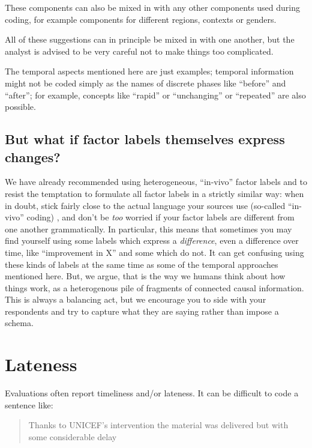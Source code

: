 \documentclass[
]{book}
\begin{document}
These components can also be mixed in with any other components used during coding, for example components for different regions, contexts or genders.

All of these suggestions can in principle be mixed in with one another, but the analyst is advised to be very careful not to make things too complicated.

The temporal aspects mentioned here are just examples; temporal information might not be coded simply as the names of discrete phases like ``before'' and ``after''; for example, concepts like ``rapid'' or ``unchanging'' or ``repeated'' are also possible.

\hypertarget{but-what-if-factor-labels-themselves-express-changes}{%
\subsection{But what if factor labels themselves express changes?}\label{but-what-if-factor-labels-themselves-express-changes}}

We have already recommended using heterogeneous, ``in-vivo'' factor labels and to resist the temptation to formulate all factor labels in a strictly similar way: when in doubt, stick fairly close to the actual language your sources use (so-called ``in-vivo'' coding) , and don't be \emph{too} worried if your factor labels are different from one another grammatically. In particular, this means that sometimes you may find yourself using some labels which express a \emph{difference}, even a difference over time, like ``improvement in X'' and some which do not. It can get confusing using these kinds of labels at the same time as some of the temporal approaches mentioned here. But, we argue, that is the way we humans think about how things work, as a heterogenous pile of fragments of connected causal information. This is always a balancing act, but we encourage you to side with your respondents and try to capture what they are saying rather than impose a schema.

\hypertarget{xlateness}{%
\section{Lateness}\label{xlateness}}

Evaluations often report timeliness and/or lateness. It can be difficult to code a sentence like:

\begin{quote}
Thanks to UNICEF's intervention the material was delivered but with some considerable delay
\end{quote}
\end{document}

